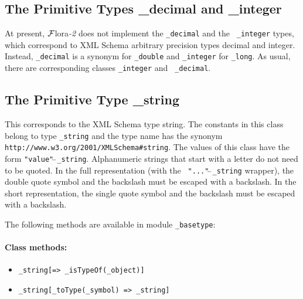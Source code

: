 \documentclass[11pt]{article}
\newcommand{\FLORA}{{\mbox{\sc ${\cal F}${lora}\rm\emph{-2}}}\xspace}
\begin{document}
\subsection{ The Primitive Types \_decimal and \_integer}

At present, \FLORA does not implement the {\tt \_decimal} and the {\tt
  \_integer} types, which correspond to XML Schema arbitrary precision
types decimal and integer.  Instead, {\tt \_decimal}  is a synonym for
{\tt \_double} and {\tt \_integer} for {\tt \_long}.   
As usual, there are corresponding classes {\tt \_integer} and {\tt
  \_decimal}. 


\subsection{ The Primitive Type \_string}

This corresponds to the XML Schema type string.  The constants in this
class belong to type {\tt \_string} and the type name has the synonym {\tt
  http://www.w3.org/2001/XMLSchema\#string}.  The values of this class have
the form {\tt "value"$\hat{~}\hat{~}$\_string}.  
Alphanumeric strings that start with a letter do
not need to be quoted. In the full representation (with the {\tt
  "..."$\hat{~}\hat{~}$\_string} wrapper), the double quote symbol and the backslash must
be escaped with a backslash. In the short representation, the single quote
symbol and the backslash must be escaped with a backslash.

The following methods are available in module {\tt \_basetype}:

\paragraph{Class methods:}
\begin{itemize}
\item {\tt \_string[=> \_isTypeOf(\_object)]}  
\item {\tt \_string[\_toType(\_symbol) => \_string]}  
\end{itemize}
\end{document}
